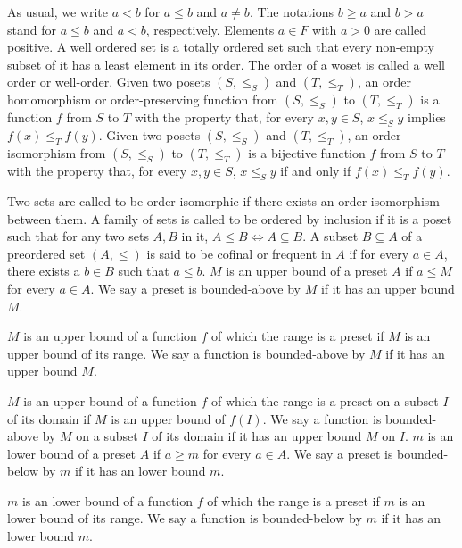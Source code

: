 \documentclass[a4paper,12pt]{article}
\begin{document}
As usual, we write $a<b$ for $a\leq b$ and $a\neq b$. The notations $b\geq a$ and $b>a$ stand for $a\leq b$ and $a<b$, respectively. Elements $a\in F$ with $a>0$ are called positive.
A well ordered set is a totally ordered set such that every non-empty subset of it has a least element in its order. The order of a woset is called a well order or well-order.
Given two posets $(S,\leq _{S})$ and $(T,\leq _{T})$, an order homomorphism or order-preserving function from $(S,\leq _{S})$ to $(T,\leq _{T})$ is a function $f$ from $S$ to $T$ with the property that, for every $x,y\in S$, $x \leq_S y$ implies $f(x)\leq _{T}f(y)$.
Given two posets $(S,\leq _{S})$ and $(T,\leq _{T})$, an order isomorphism from $(S,\leq _{S})$ to $(T,\leq _{T})$ is a bijective function $f$ from $S$ to $T$ with the property that, for every $x,y\in S$, $x \leq_S y$ if and only if $f(x)\leq _{T}f(y)$.

Two sets are called to be order-isomorphic if there exists an order isomorphism between them.
A family of sets is called to be ordered by inclusion if it is a poset such that for any two sets $A,B$ in it, $A\leq B\iff A\subseteq B$.
A subset $B\subseteq A$ of a preordered set $(A,\leq )$ is said to be cofinal or frequent in $A$ if for every $a\in A$, there exists a $b\in B$ such that $a\leq b$.
$M$ is an upper bound of a preset $A$ if $a\leq M$ for every $a\in A$. We say a preset is bounded-above by $M$ if it has an upper bound $M$.

$M$ is an upper bound of a function $f$ of which the range is a preset if $M$ is an upper bound of its range. We say a function is bounded-above by $M$ if it has an upper bound $M$.

$M$ is an upper bound of a function $f$ of which the range is a preset on a subset $I$ of its domain if $M$ is an upper bound of $f(I)$. We say a function is bounded-above by $M$ on a subset $I$ of its domain if it has an upper bound $M$ on $I$.
$m$ is an lower bound of a preset $A$ if $a\geq m$ for every $a\in A$. We say a preset is bounded-below by $m$ if it has an lower bound $m$.

$m$ is an lower bound of a function $f$ of which the range is a preset if $m$ is an lower bound of its range. We say a function is bounded-below by $m$ if it has an lower bound $m$.
\end{document}
